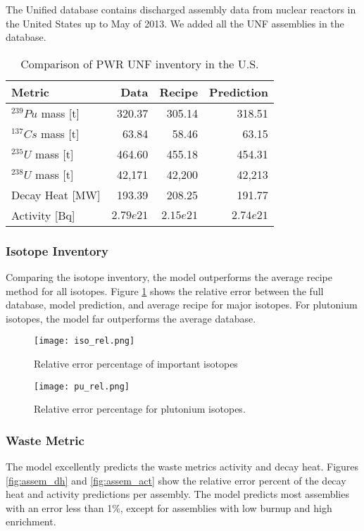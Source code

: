 The Unified database contains discharged assembly data
from nuclear reactors in the United States up to May of
2013. We added all the \gls{UNF} assemblies in the database.


\begin{table}[h]
    \centering
    \begin{tabular}{l|r|rr}
        \hline
        Metric & Data & Recipe & Prediction \\
        \hline
        $^{239}Pu$ mass [t] & 320.37 & 305.14 & 318.51\\
        $^{137}Cs$ mass [t] & 63.84 & 58.46 & 63.15 \\
        $^{235}U$ mass [t] & 464.60 & 455.18 & 454.31\\
        $^{238}U$ mass [t] & 42,171 & 42,200 & 42,213\\
        \hline
        Decay Heat [MW] & 193.39 & 208.25 & 191.77 \\
        Activity [Bq] & $2.79e21$ & $2.15e21$ & $2.74e21$ \\
        \hline
    \end{tabular}
    \caption{Comparison of \gls{PWR} \gls{UNF} inventory in the U.S.}
\end{table}

\FloatBarrier

\subsubsection{Isotope Inventory}

Comparing the isotope inventory, the model outperforms the
average recipe method for all isotopes.
Figure \ref{fig:iso_rel} shows the relative
error between the full database, model prediction, and
average recipe for
major isotopes. For plutonium isotopes, the model far
outperforms the average database.

\begin{figure}
    \centering
    \texttt{[image: iso\_rel.png]}
    \caption{Relative error percentage of important isotopes}
    \label{fig:iso_rel}
\end{figure}


\begin{figure}
    \centering
    \texttt{[image: pu\_rel.png]}
    \caption{Relative error percentage for plutonium isotopes.}
    \label{fig:pu_rel}
\end{figure}

\FloatBarrier


\subsubsection{Waste Metric}
The model excellently predicts the waste metrics activity
and decay heat. Figures \ref{fig:assem_dh} and \ref{fig:assem_act}
show the relative error percent of the decay heat and activity
predictions per assembly. The model predicts most assemblies
with an error less than 1\%, except for assemblies with low
burnup and high enrichment.


